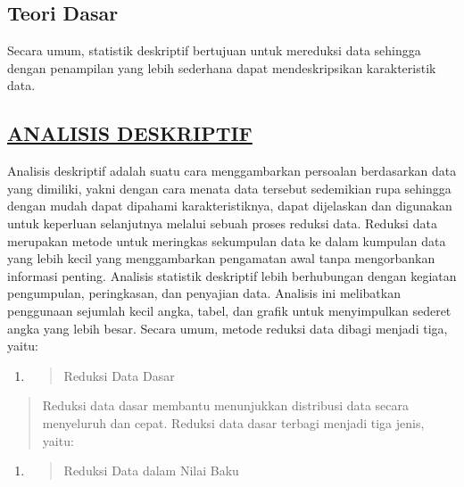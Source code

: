 \documentclass[
]{article}
\begin{document}
\hypertarget{teori-dasar}{%
\subsection{Teori Dasar}\label{teori-dasar}}

Secara umum, statistik deskriptif bertujuan untuk mereduksi data
sehingga dengan penampilan yang lebih sederhana dapat mendeskripsikan
karakteristik data.

\hypertarget{analisis-deskriptif}{%
\subsection{\texorpdfstring{\uline{ANALISIS
DESKRIPTIF}}{ANALISIS DESKRIPTIF}}\label{analisis-deskriptif}}

Analisis deskriptif adalah suatu cara menggambarkan persoalan
berdasarkan data yang dimiliki, yakni dengan cara menata data tersebut
sedemikian rupa sehingga dengan mudah dapat dipahami karakteristiknya,
dapat dijelaskan dan digunakan untuk keperluan selanjutnya melalui
sebuah proses reduksi data. Reduksi data merupakan metode untuk
meringkas sekumpulan data ke dalam kumpulan data yang lebih kecil yang
menggambarkan pengamatan awal tanpa mengorbankan informasi penting.
Analisis statistik deskriptif lebih berhubungan dengan kegiatan
pengumpulan, peringkasan, dan penyajian data. Analisis ini melibatkan
penggunaan sejumlah kecil angka, tabel, dan grafik untuk menyimpulkan
sederet angka yang lebih besar. Secara umum, metode reduksi data dibagi
menjadi tiga, yaitu:

\begin{enumerate}
\def\labelenumi{\Alph{enumi}.}
\item
  \begin{quote}
  Reduksi Data Dasar
  \end{quote}
\end{enumerate}

\begin{quote}
Reduksi data dasar membantu menunjukkan distribusi data secara
menyeluruh dan cepat. Reduksi data dasar terbagi menjadi tiga jenis,
yaitu:
\end{quote}

\begin{enumerate}
\def\labelenumi{\arabic{enumi}.}
\item
  \begin{quote}
  Reduksi Data dalam Nilai Baku
  \end{quote}
\end{enumerate}
\end{document}
